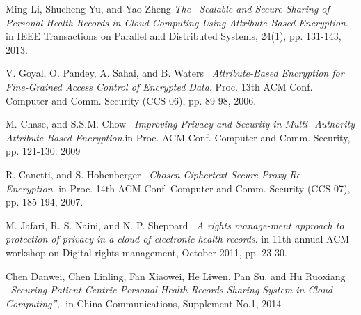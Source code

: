 \begin{thebibliography}{15}
Ming Li, Shucheng Yu, and Yao Zheng
\textit{The \ Scalable and Secure Sharing of Personal
Health Records in Cloud Computing Using Attribute-Based Encryption}.  in IEEE Transactions on Parallel and Distributed Systems, 24(1), pp. 131-143, 2013.

V. Goyal, O. Pandey, A. Sahai, and B. Waters
\textit{ \ Attribute-Based
Encryption for Fine-Grained Access Control of Encrypted Data}. Proc. 13th ACM Conf. Computer and Comm. Security (CCS 06), pp. 89-98, 2006.

M. Chase, and S.S.M. Chow
\textit{\ Improving Privacy and Security in Multi-
Authority Attribute-Based Encryption}.in  Proc. ACM Conf. Computer and Comm. Security, pp. 121-130. 2009

R. Canetti, and S. Hohenberger 
\textit{\ Chosen-Ciphertext Secure Proxy Re-
Encryption}.  in Proc. 14th ACM Conf. Computer and Comm. Security (CCS 07), pp. 185-194, 2007.

M. Jafari, R. S. Naini, and N. P. Sheppard
\textit{\ A rights manage-ment approach to protection of privacy in a cloud of electronic health records}.  in 11th annual
ACM workshop on Digital rights management, October 2011, pp. 23-30.

Chen Danwei, Chen Linling, Fan Xiaowei, He Liwen, Pan Su, and Hu
Ruoxiang  \textit{\ Securing Patient-Centric Personal Health Records Sharing System in Cloud Computing”,}.  in China Communications, Supplement No.1, 2014

\end{thebibliography}


